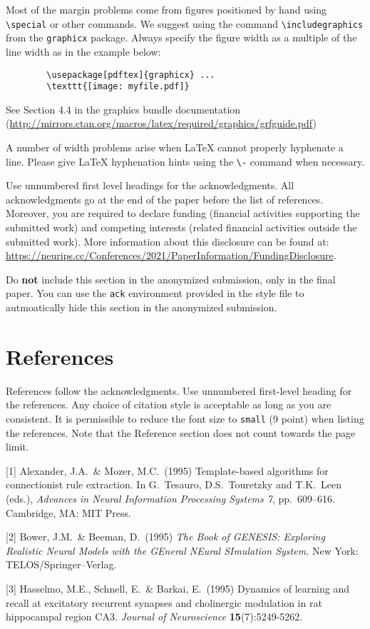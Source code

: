\documentclass{article}
\begin{document}
	Most of the margin problems come from figures positioned by hand using
	\verb+\special+ or other commands. We suggest using the command
	\verb+\includegraphics+ from the \verb+graphicx+ package. Always specify the
	figure width as a multiple of the line width as in the example below:
	\begin{verbatim}
		\usepackage[pdftex]{graphicx} ...
		\texttt{[image: myfile.pdf]}
	\end{verbatim}
	See Section 4.4 in the graphics bundle documentation
	(\url{http://mirrors.ctan.org/macros/latex/required/graphics/grfguide.pdf})
	
	A number of width problems arise when \LaTeX{} cannot properly hyphenate a
	line. Please give LaTeX hyphenation hints using the \verb+\-+ command when
	necessary.
	
	\begin{ack}
		Use unnumbered first level headings for the acknowledgments. All acknowledgments
		go at the end of the paper before the list of references. Moreover, you are required to declare
		funding (financial activities supporting the submitted work) and competing interests (related financial activities outside the submitted work).
		More information about this disclosure can be found at: \url{https://neurips.cc/Conferences/2021/PaperInformation/FundingDisclosure}.
		
		Do {\bf not} include this section in the anonymized submission, only in the final paper. You can use the \texttt{ack} environment provided in the style file to autmoatically hide this section in the anonymized submission.
	\end{ack}
	
	\section*{References}
	
	References follow the acknowledgments. Use unnumbered first-level heading for
	the references. Any choice of citation style is acceptable as long as you are
	consistent. It is permissible to reduce the font size to \verb+small+ (9 point)
	when listing the references.
	Note that the Reference section does not count towards the page limit.
	\medskip
	
	{
		\small
		
		[1] Alexander, J.A.\ \& Mozer, M.C.\ (1995) Template-based algorithms for
		connectionist rule extraction. In G.\ Tesauro, D.S.\ Touretzky and T.K.\ Leen
		(eds.), {\it Advances in Neural Information Processing Systems 7},
		pp.\ 609--616. Cambridge, MA: MIT Press.
		
		[2] Bower, J.M.\ \& Beeman, D.\ (1995) {\it The Book of GENESIS: Exploring
			Realistic Neural Models with the GEneral NEural SImulation System.}  New York:
		TELOS/Springer--Verlag.
		
		[3] Hasselmo, M.E., Schnell, E.\ \& Barkai, E.\ (1995) Dynamics of learning and
		recall at excitatory recurrent synapses and cholinergic modulation in rat
		hippocampal region CA3. {\it Journal of Neuroscience} {\bf 15}(7):5249-5262.
	}
	
\end{document}
